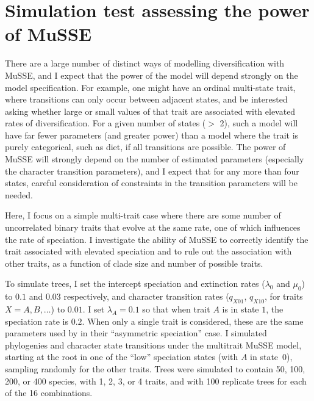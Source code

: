 \documentclass[12pt]{article}
\begin{document}
\section{Simulation test assessing the power of MuSSE}
\label{sec:musse-sim}

There are a large number of distinct ways of modelling diversification
with MuSSE, and I expect that the power of the model will depend
strongly on the model specification.
%
For example, one might have an ordinal multi-state trait, where
transitions can only occur between adjacent states, and be interested
asking whether large or small values of that trait are associated with
elevated rates of diversification.  For a given number of states ($>$
2), such a model will have far fewer parameters (and greater power)
than a model where the trait is purely categorical, such as diet, if
all transitions are possible.
%
The power of MuSSE will strongly depend on the number of estimated
parameters (especially the character transition parameters), and I
expect that for any more than four states, careful consideration of
constraints in the transition parameters will be needed.

Here, I focus on a simple multi-trait case where there are some number
of uncorrelated binary traits that evolve at the same rate, one of
which influences the rate of speciation.  I investigate the ability of
MuSSE to correctly identify the trait associated with elevated
speciation and to rule out the association with other traits, as a
function of clade size and number of possible traits.

To simulate trees, I set the intercept speciation and extinction rates
($\lambda_0$ and $\mu_0$) to $0.1$ and $0.03$ respectively, and
character transition rates ($q_{X01}$, $q_{X10}$, for traits
$X=A,B,\ldots$) to $0.01$.  I set $\lambda_A = 0.1$ so that when trait
$A$ is in state $1$, the speciation rate is $0.2$.
%
When only a single trait is considered, these are the same parameters
used by \citet{Maddison-2007-701} in their ``asymmetric speciation''
case.
%
I simulated phylogenies and character state transitions under the
multitrait MuSSE model, starting at the root in one of the ``low''
speciation states (with $A$ in state~0), sampling randomly for the
other traits.  Trees were simulated to contain 50, 100, 200, or 400
species, with 1, 2, 3, or 4 traits, and with 100 replicate trees for
each of the 16 combinations.
\end{document}
